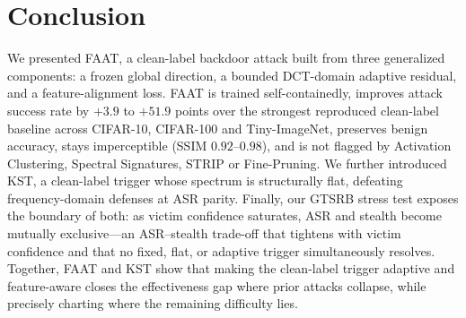 \section{Conclusion}
\label{sec:conclusion}

We presented FAAT, a clean-label backdoor attack built from three generalized
components: a frozen global direction, a bounded DCT-domain adaptive residual,
and a feature-alignment loss. FAAT is trained self-containedly, improves attack
success rate by $+3.9$ to $+51.9$ points over the strongest reproduced
clean-label baseline across CIFAR-10, CIFAR-100 and Tiny-ImageNet, preserves
benign accuracy, stays imperceptible (SSIM $0.92$--$0.98$), and is not flagged
by Activation Clustering, Spectral Signatures, STRIP or Fine-Pruning. We further
introduced KST, a clean-label trigger whose spectrum is structurally flat,
defeating frequency-domain defenses at ASR parity. Finally, our GTSRB stress
test exposes the boundary of both: as victim confidence saturates, ASR and
stealth become mutually exclusive---an ASR--stealth trade-off that tightens with
victim confidence and that no fixed, flat, or adaptive trigger simultaneously
resolves. Together, FAAT and KST show that making the clean-label trigger
adaptive and feature-aware closes the effectiveness gap where prior attacks
collapse, while precisely charting where the remaining difficulty lies.
